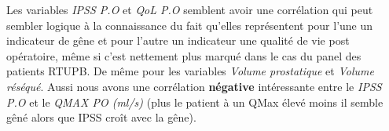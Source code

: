 Les variables  \emph{IPSS P.O} et   \emph{QoL P.O}  semblent avoir une corrélation qui peut sembler logique à la connaissance du fait qu’elles représentent pour l’une un indicateur de gêne et pour l’autre un indicateur une qualité de vie post opératoire, même si c’est nettement plus marqué dans le cas du panel des patients RTUPB. De même  pour les variables \emph{Volume prostatique} et \emph{Volume réséqué}. Aussi nous avons une corrélation \textbf{négative} intéressante entre le \emph{IPSS P.O} et le \emph{QMAX PO (ml/s)} (plus le patient à un QMax élevé moins il semble gêné alors que IPSS croît avec la gêne). 









%
